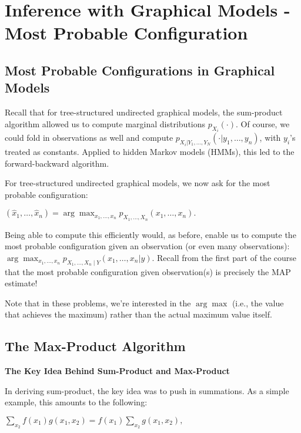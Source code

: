 \documentclass[6008notes.tex]{subfiles}
\begin{document}
\graphicspath{ {images/mostprob/} }

\section{Inference with Graphical Models - Most Probable Configuration}

\subsection{Most Probable Configurations in Graphical Models}

Recall that for tree-structured undirected graphical models, the sum-product algorithm allowed us to compute marginal distributions $p_{X_ i}(\cdot )$. Of course, we could fold in observations as well and compute $p_{X_ i|Y_1,\dots ,Y_ N}(\cdot |y_1,\dots ,y_ n)$, with $y_i$'s treated as constants. Applied to hidden Markov models (HMMs), this led to the forward-backward algorithm.

For tree-structured undirected graphical models, we now ask for the most probable configuration:

{\centering$(\hat{x}_1, \dots , \hat{x}_ n) = \arg \max _{x_1,\dots ,x_ n}p_{X_1,\dots ,X_ n}(x_1,\dots ,x_ n).$ \par}
 
Being able to compute this efficiently would, as before, enable us to compute the most probable configuration given an observation (or even many observations): $\arg \max _{x_1,\dots ,x_ n} p_{X_1,\dots ,X_ n\mid Y}(x_1,\dots ,x_ n|y)$. Recall from the first part of the course that the most probable configuration given observation(s) is precisely the MAP estimate!

Note that in these problems, we're interested in the $\arg \max$ (i.e., the value that achieves the maximum) rather than the actual maximum value itself.


\subsection{The Max-Product Algorithm}

\textbf{The Key Idea Behind Sum-Product and Max-Product}

In deriving sum-product, the key idea was to push in summations. As a simple example, this amounts to the following:

{\centering$\sum _{x_2}f(x_1)g(x_1,x_2) = f(x_1) \sum _{x_2}g(x_1,x_2),$ \par}
 
\end{document}
